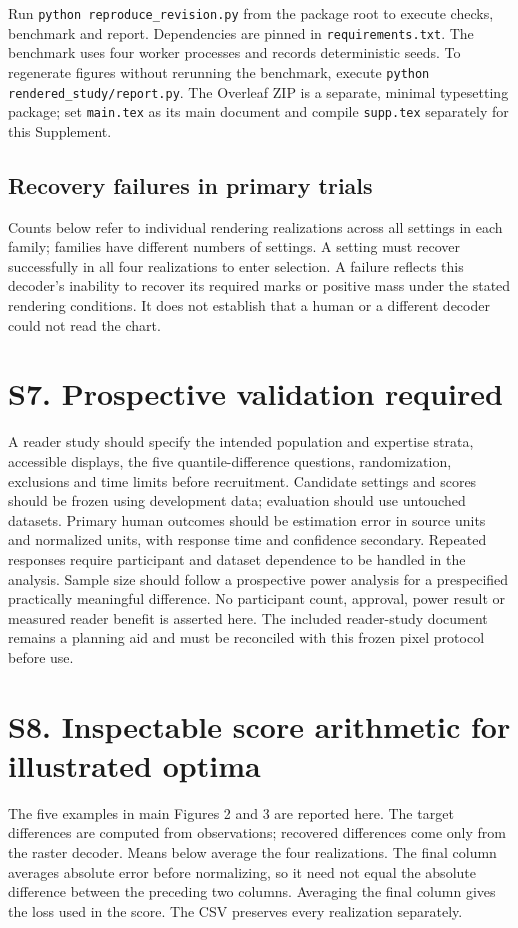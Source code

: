 \documentclass[10pt]{article}
\begin{document}
Run \texttt{python reproduce\_revision.py} from the package root to execute checks, benchmark and report. Dependencies are pinned in \texttt{requirements.txt}. The benchmark uses four worker processes and records deterministic seeds. To regenerate figures without rerunning the benchmark, execute \texttt{python rendered\_study/report.py}. The Overleaf ZIP is a separate, minimal typesetting package; set \texttt{main.tex} as its main document and compile \texttt{supp.tex} separately for this Supplement.

\subsection*{Recovery failures in primary trials}
Counts below refer to individual rendering realizations across all settings in each family; families have different numbers of settings. A setting must recover successfully in all four realizations to enter selection. A failure reflects this decoder's inability to recover its required marks or positive mass under the stated rendering conditions. It does not establish that a human or a different decoder could not read the chart.
\begin{center}\end{center}

\section*{S7. Prospective validation required}
A reader study should specify the intended population and expertise strata, accessible displays, the five quantile-difference questions, randomization, exclusions and time limits before recruitment. Candidate settings and scores should be frozen using development data; evaluation should use untouched datasets. Primary human outcomes should be estimation error in source units and normalized units, with response time and confidence secondary. Repeated responses require participant and dataset dependence to be handled in the analysis. Sample size should follow a prospective power analysis for a prespecified practically meaningful difference. No participant count, approval, power result or measured reader benefit is asserted here. The included reader-study document remains a planning aid and must be reconciled with this frozen pixel protocol before use.

\section*{S8. Inspectable score arithmetic for illustrated optima}
The five examples in main Figures 2 and 3 are reported here. The target differences are computed from observations; recovered differences come only from the raster decoder. Means below average the four realizations. The final column averages absolute error before normalizing, so it need not equal the absolute difference between the preceding two columns. Averaging the final column gives the loss used in the score. The CSV preserves every realization separately.
\end{document}
